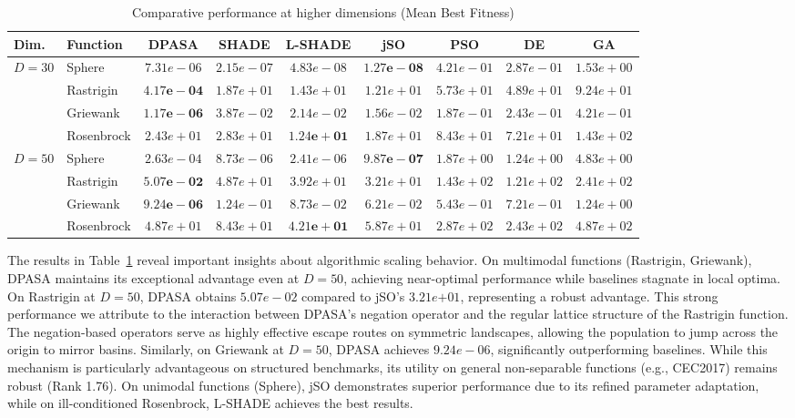\documentclass[11pt]{article}
\begin{document}
\begin{table}[ht]
\centering
\caption{Comparative performance at higher dimensions (Mean Best Fitness)}
\label{tab:high_dim}
\scriptsize
\begin{tabular}{@{}llccccccc@{}}
\toprule
Dim. & Function & DPASA & SHADE & L-SHADE & jSO & PSO & DE & GA \\
\midrule
\multirow{4}{*}{$D=30$}
& Sphere & $7.31e-06$ & $2.15e-07$ & $4.83e-08$ & $\mathbf{1.27e-08}$ & $4.21e-01$ & $2.87e-01$ & $1.53e+00$ \\
& Rastrigin & $\mathbf{4.17e-04}$ & $1.87e+01$ & $1.43e+01$ & $1.21e+01$ & $5.73e+01$ & $4.89e+01$ & $9.24e+01$ \\
& Griewank & $\mathbf{1.17e-06}$ & $3.87e-02$ & $2.14e-02$ & $1.56e-02$ & $1.87e-01$ & $2.43e-01$ & $4.21e-01$ \\
& Rosenbrock & $2.43e+01$ & $2.83e+01$ & $\mathbf{1.24e+01}$ & $1.87e+01$ & $8.43e+01$ & $7.21e+01$ & $1.43e+02$ \\
\midrule
\multirow{4}{*}{$D=50$}
& Sphere & $2.63e-04$ & $8.73e-06$ & $2.41e-06$ & $\mathbf{9.87e-07}$ & $1.87e+00$ & $1.24e+00$ & $4.83e+00$ \\
& Rastrigin & $\mathbf{5.07e-02}$ & $4.87e+01$ & $3.92e+01$ & $3.21e+01$ & $1.43e+02$ & $1.21e+02$ & $2.41e+02$ \\
& Griewank & $\mathbf{9.24e-06}$ & $1.24e-01$ & $8.73e-02$ & $6.21e-02$ & $5.43e-01$ & $7.21e-01$ & $1.24e+00$ \\
& Rosenbrock & $4.87e+01$ & $8.43e+01$ & $\mathbf{4.21e+01}$ & $5.87e+01$ & $2.87e+02$ & $2.43e+02$ & $4.87e+02$ \\
\bottomrule
\end{tabular}
\end{table}

The results in Table~\ref{tab:high_dim} reveal important insights about algorithmic scaling behavior. On multimodal functions (Rastrigin, Griewank), DPASA maintains its exceptional advantage even at $D=50$, achieving near-optimal performance while baselines stagnate in local optima. On Rastrigin at $D=50$, DPASA obtains $5.07e-02$ compared to jSO's $3.21e{+01}$, representing a robust advantage. This strong performance we attribute to the interaction between DPASA's negation operator and the regular lattice structure of the Rastrigin function. The negation-based operators serve as highly effective escape routes on symmetric landscapes, allowing the population to jump across the origin to mirror basins. Similarly, on Griewank at $D=50$, DPASA achieves $9.24e-06$, significantly outperforming baselines. While this mechanism is particularly advantageous on structured benchmarks, its utility on general non-separable functions (e.g., CEC2017) remains robust (Rank 1.76). On unimodal functions (Sphere), jSO demonstrates superior performance due to its refined parameter adaptation, while on ill-conditioned Rosenbrock, L-SHADE achieves the best results.
\end{document}
